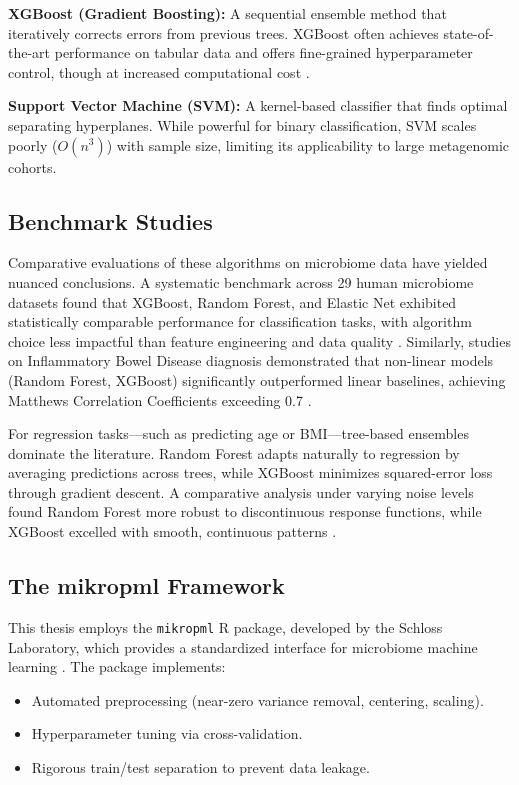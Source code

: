 \textbf{XGBoost (Gradient Boosting):} A sequential ensemble method that iteratively corrects errors from previous trees. XGBoost often achieves state-of-the-art performance on tabular data and offers fine-grained hyperparameter control, though at increased computational cost \cite{chen2016xgboost}.

\textbf{Support Vector Machine (SVM):} A kernel-based classifier that finds optimal separating hyperplanes. While powerful for binary classification, SVM scales poorly ($O(n^3)$) with sample size, limiting its applicability to large metagenomic cohorts.

\subsection{Benchmark Studies}

Comparative evaluations of these algorithms on microbiome data have yielded nuanced conclusions. A systematic benchmark across 29 human microbiome datasets found that XGBoost, Random Forest, and Elastic Net exhibited statistically comparable performance for classification tasks, with algorithm choice less impactful than feature engineering and data quality \cite{topccuouglu2020framework}. Similarly, studies on Inflammatory Bowel Disease diagnosis demonstrated that non-linear models (Random Forest, XGBoost) significantly outperformed linear baselines, achieving Matthews Correlation Coefficients exceeding 0.7 \cite{ibdbenchmark2024}.

For regression tasks---such as predicting age or BMI---tree-based ensembles dominate the literature. Random Forest adapts naturally to regression by averaging predictions across trees, while XGBoost minimizes squared-error loss through gradient descent. A comparative analysis under varying noise levels found Random Forest more robust to discontinuous response functions, while XGBoost excelled with smooth, continuous patterns \cite{regressionbenchmark2023}.

\subsection{The mikropml Framework}

This thesis employs the \texttt{mikropml} R package, developed by the Schloss Laboratory, which provides a standardized interface for microbiome machine learning \cite{mikropml2021}. The package implements:

\begin{itemize}
    \item Automated preprocessing (near-zero variance removal, centering, scaling).
    \item Hyperparameter tuning via cross-validation.
    \item Rigorous train/test separation to prevent data leakage.
\end{itemize}


